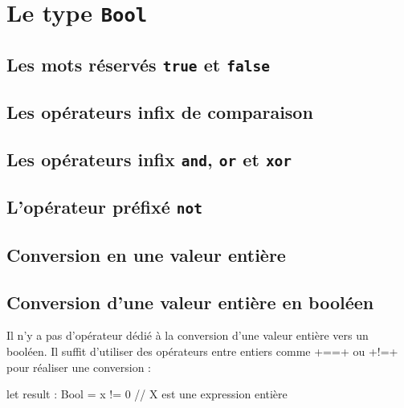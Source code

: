 




\chapter{Le type \texttt{Bool}}


\section{Les mots réservés \texttt{true} et \texttt{false}}


\section{Les opérateurs infix de comparaison}


\section{Les opérateurs infix \texttt{and}, \texttt{or} et \texttt{xor}}

\section{L'opérateur préfixé \texttt{not}}

\section{Conversion en une valeur entière}

\section{Conversion d'une valeur entière en booléen}

Il n'y a pas d'opérateur dédié à la conversion d'une valeur entière vers un booléen. Il suffit d'utiliser des opérateurs entre entiers comme \plm+==+ ou \plm+!=+ pour réaliser une conversion :

\begin{PLM}
let result : Bool = x != 0 // X est une expression entière
\end{PLM}


